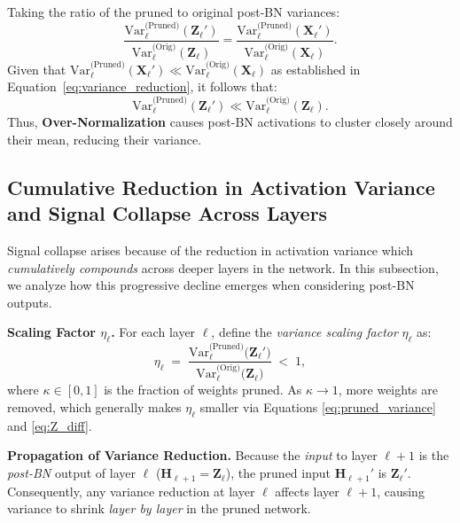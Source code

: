 Taking the ratio of the pruned to original post-BN variances:
\begin{equation}
    \frac{\mathrm{Var}_\ell^{\text{(Pruned)}}(\mathbf{Z}_\ell')}{\mathrm{Var}_\ell^{\text{(Orig)}}(\mathbf{Z}_\ell)} = \frac{\mathrm{Var}_\ell^{\text{(Pruned)}}(\mathbf{X}_\ell')}{\mathrm{Var}_\ell^{\text{(Orig)}}(\mathbf{X}_\ell)}.
    \label{eq:variance_ratio}
\end{equation}
Given that \(\mathrm{Var}_\ell^{\text{(Pruned)}}(\mathbf{X}_\ell') \ll \mathrm{Var}_\ell^{\text{(Orig)}}(\mathbf{X}_\ell)\) as established in Equation~\ref{eq:variance_reduction}, it follows that:
\begin{equation}
\mathrm{Var}_\ell^{\text{(Pruned)}}(\mathbf{Z}_\ell') \ll \mathrm{Var}_\ell^{\text{(Orig)}}(\mathbf{Z}_\ell).\label{eq:Z_diff}
\end{equation}
Thus, \textbf{Over-Normalization} causes post-BN activations to cluster closely around their mean, reducing their variance. 

\subsection{Cumulative Reduction in Activation Variance and Signal Collapse Across Layers}

Signal collapse arises because of the reduction in activation variance which \emph{cumulatively compounds} across deeper layers in the network. In this subsection, we analyze how this progressive decline emerges when considering post-BN outputs.

\noindent
\textbf{Scaling Factor \(\eta_\ell\).}
For each layer \(\ell\), define the \emph{variance scaling factor} \(\eta_\ell\) as:
\begin{equation}
    \eta_\ell 
    \;=\; 
    \frac{\mathrm{Var}_\ell^{\text{(Pruned)}}\!\bigl(\mathbf{Z}_\ell'\bigr)}
         {\mathrm{Var}_\ell^{\text{(Orig)}}\!\bigl(\mathbf{Z}_\ell\bigr)}
    \;<\; 1,
    \label{eq:scaling_factor}
\end{equation}
where \(\kappa \in [0,1]\) is the fraction of weights pruned. As \(\kappa \to 1\), more weights are removed, which generally makes \(\eta_\ell\) smaller via Equations \ref{eq:pruned_variance} and \ref{eq:Z_diff}.

\noindent
\textbf{Propagation of Variance Reduction.}
Because the \emph{input} to layer \(\ell+1\) is the \emph{post-BN} output of layer \(\ell\) (\(\mathbf{H}_{\ell+1} = \mathbf{Z}_\ell\)), the pruned input \(\mathbf{H}_{\ell+1}'\) is \(\mathbf{Z}_\ell'\). Consequently, any variance reduction at layer \(\ell\) affects layer \(\ell+1\), causing variance to shrink \emph{layer by layer} in the pruned network.

